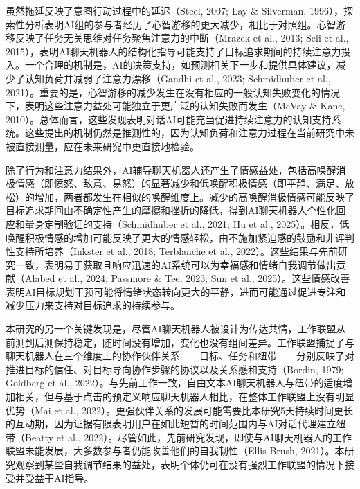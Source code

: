 \par 虽然拖延反映了意图行动过程中的延迟（Steel, 2007; Lay \& Silverman, 1996），探索性分析表明AI组的参与者经历了心智游移的更大减少，相比于对照组。心智游移反映了任务无关思维对任务聚焦注意力的中断（Mrazek et al., 2013; Seli et al., 2015），表明AI聊天机器人的结构化指导可能支持了目标追求期间的持续注意力投入。一个合理的机制是，AI的决策支持，如预测相关下一步和提供具体建议，减少了认知负荷并减弱了注意力漂移（Gandhi et al., 2023; Schmidhuber et al., 2021）。重要的是，心智游移的减少发生在没有相应的一般认知失败变化的情况下，表明这些注意力益处可能独立于更广泛的认知失败而发生（McVay \& Kane, 2010）。总体而言，这些发现表明对话AI可能充当促进持续注意力的认知支持系统。这些提出的机制仍然是推测性的，因为认知负荷和注意力过程在当前研究中未被直接测量，应在未来研究中更直接地检验。

\par 除了行为和注意力结果外，AI辅导聊天机器人还产生了情感益处，包括高唤醒消极情感（即愤怒、敌意、易怒）的显著减少和低唤醒积极情感（即平静、满足、放松）的增加，两者都发生在相似的唤醒维度上。减少的高唤醒消极情感可能反映了目标追求期间由不确定性产生的摩擦和挫折的降低，得到AI聊天机器人个性化回应和量身定制验证的支持（Schmidhuber et al., 2021; Hu et al., 2025）。相反，低唤醒积极情感的增加可能反映了更大的情感轻松，由不施加紧迫感的鼓励和非评判性支持所培养（Inkster et al., 2018; Terblanche et al., 2022）。这些结果与先前研究一致，表明易于获取且响应迅速的AI系统可以为幸福感和情绪自我调节做出贡献（Alabed et al., 2024; Passmore \& Tee, 2023; Sun et al., 2025）。这些情感改善表明AI目标规划干预可能将情绪状态转向更大的平静，进而可能通过促进专注和减少压力来支持对目标追求的持续参与。

\par 本研究的另一个关键发现是，尽管AI聊天机器人被设计为传达共情，工作联盟从前测到后测保持稳定，随时间没有增加，变化也没有组间差异。工作联盟捕捉了与聊天机器人在三个维度上的协作伙伴关系——目标、任务和纽带——分别反映了对推进目标的信任、对目标导向协作步骤的协议以及关系感和支持（Bordin, 1979; Goldberg et al., 2022）。与先前工作一致，自由文本AI聊天机器人与纽带的适度增加相关，但与基于点击的预定义响应聊天机器人相比，在整体工作联盟上没有明显优势（Mai et al., 2022）。更强伙伴关系的发展可能需要比本研究5天持续时间更长的互动期，因为证据有限表明用户在如此短暂的时间范围内与AI对话代理建立纽带（Beatty et al., 2022）。尽管如此，先前研究发现，即使与AI聊天机器人的工作联盟未能发展，大多数参与者仍能改善他们的自我韧性（Ellis-Brush, 2021）。本研究观察到某些自我调节结果的益处，表明个体仍可在没有强烈工作联盟的情况下接受并受益于AI指导。

